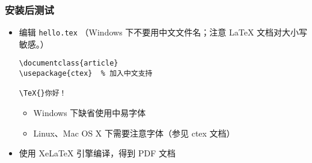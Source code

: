 \begin{frame}[fragile]
  \frametitle{安装后测试}

  \begin{itemize}
    \item 编辑 \texttt{hello.tex} （Windows 下不要用中文文件名；注意
      \LaTeX{} 文档对大小写敏感。）
      \lstset{language=[LaTeX]TeX}
      \begin{card} \begin{lstlisting}[basicstyle=\ttfamily]
\documentclass{article}
\usepackage{ctex}  % 加入中文支持

\TeX{}你好！

        \end{lstlisting}\end{card}
      \begin{itemize}
        \item Windows 下缺省使用中易字体
        \item Linux、Mac OS X 下需要注意字体（参见 ctex 文档）
      \end{itemize}
    \item 使用 XeLaTeX 引擎编译，得到 PDF 文档
      \begin{center}
      \end{center}
  \end{itemize}
\end{frame}

